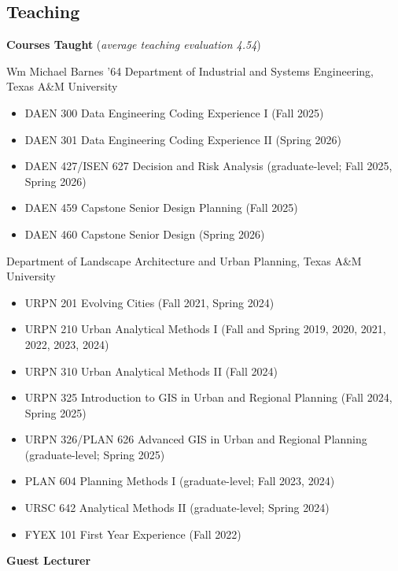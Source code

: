\documentclass[11pt,oneside]{article}
\begin{document}
\subsection*{Teaching}

\textbf{Courses Taught} (\emph{average teaching evaluation 4.54})

\vspace{3pt}

{Wm Michael Barnes ’64 Department of Industrial and Systems Engineering, Texas A\&M University}
\begin{itemize}[leftmargin=20pt]
\item DAEN 300 Data Engineering Coding Experience I (Fall 2025)
\item DAEN 301 Data Engineering Coding Experience II (Spring 2026)
\item DAEN 427/ISEN 627 Decision and Risk Analysis (graduate-level; Fall 2025, Spring 2026)
\item DAEN 459 Capstone Senior Design Planning (Fall 2025)
\item DAEN 460 Capstone Senior Design (Spring 2026)
\end{itemize}

{Department of Landscape Architecture and Urban Planning, Texas A\&M University}
\begin{itemize}[leftmargin=20pt]
\item URPN 201 Evolving Cities (Fall 2021, Spring 2024)
\item URPN 210 Urban Analytical Methods I (Fall and Spring 2019, 2020, 2021, 2022, 2023, 2024)
\item URPN 310 Urban Analytical Methods II (Fall 2024)
\item URPN 325 Introduction to GIS in Urban and Regional Planning (Fall 2024, Spring 2025)
\item URPN 326/PLAN 626 Advanced GIS in Urban and Regional Planning (graduate-level; Spring 2025)
\item PLAN 604 Planning Methods I (graduate-level; Fall 2023, 2024)
\item URSC 642 Analytical Methods II (graduate-level; Spring 2024)
\item FYEX 101 First Year Experience (Fall 2022)
\end{itemize}

\vspace{3pt}

\textbf{Guest Lecturer}

\vspace{3pt}
\end{document}
